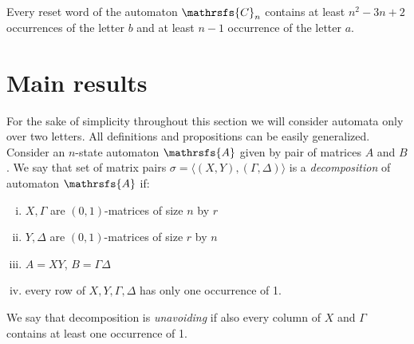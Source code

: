 \documentclass[11pt]{llncs}
\newcommand{\A}{\mathrsfs{A}}
\newcommand{\G}{\Gamma}
\newcommand{\D}{\Delta}
\begin{document}
\begin{proposition}
\label{th:cerny} Every reset word of the automaton $\mathrsfs{C}_n$ contains at
least $n^2 - 3n + 2$ occurrences of the letter $b$ and at least $n - 1$
occurrence of the letter $a$.
\end{proposition}
%
%

\section{Main results}
For the sake of simplicity throughout this section we will consider automata only
over two letters. All definitions and propositions can be easily generalized.
Consider an $n$-state automaton $\A$ given by pair of matrices $A$ and $B$.
We say that set of matrix pairs $\sigma = \langle(X,Y), (\G,\D)\rangle$ is
a \emph{decomposition} of automaton $\A$ if:
\begin{enumerate}[(i)]
\item $X, \G$ are $(0,1)$-matrices of size $n$ by $r$
\item $Y, \D$ are $(0,1)$-matrices of size $r$ by $n$
\item $A = XY$, $B = \G\D$
\item every row of $X,Y,\G,\D$ has only one occurrence of 1.
\end{enumerate}
We say that decomposition is \emph{unavoiding} if also every column of $X$ and 
$\G$ contains at least one occurrence of 1.
\end{document}
